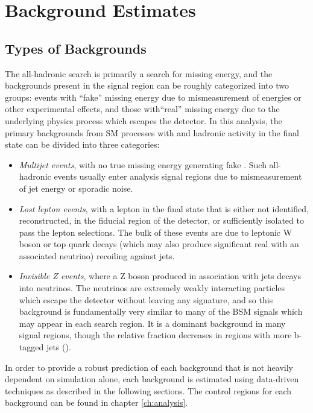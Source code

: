 \chapter{Background Estimates}
\label{ch:bkgs}

\section{Types of Backgrounds}
\label{sec:bkgs}
The \mttwo all-hadronic search is primarily a search for missing energy, and the backgrounds present in the signal region can be roughly categorized into two groups: events with ``fake'' missing energy due to mismeasurement of energies or other experimental effects, and those with``real'' missing energy due to the underlying physics process which escapes the detector. In this analysis, the primary backgrounds from SM processes with \MET and hadronic activity in the final state can be divided into three categories:
\begin{itemize}
	\item {\it Multijet events}, with no true missing energy generating fake \MET. Such all-hadronic events usually enter analysis signal regions due to mismeasurement of jet energy or sporadic noise.
	\item {\it Lost lepton events}, with a lepton in the final state that is either not identified, reconstructed, in the fiducial region of the detector, or sufficiently isolated to pass the lepton selections. The bulk of these events are due to leptonic W boson or top quark decays (which may also produce significant real \MET with an associated neutrino) recoiling against jets.
	\item {\it Invisible Z events}, where a Z boson produced in association with jets decays into neutrinos. The neutrinos are extremely weakly interacting particles which escape the detector without leaving any signature, and so this background is fundamentally very similar to many of the BSM signals which may appear in each search region. It is a dominant background in many signal regions, though the relative fraction decreases in regions with more b-tagged jets (\nb).
\end{itemize}

In order to provide a robust prediction of each background that is not heavily dependent on simulation alone, each background is estimated using data-driven techniques as described in the following sections. The control regions for each background can be found in chapter \ref{ch:analysis}.





